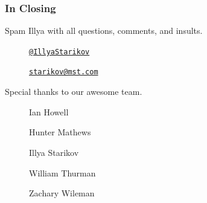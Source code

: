 \documentclass{beamer}
\begin{document}
\begin{frame}
    \frametitle{In Closing}

    Spam Illya with all questions, comments, and insults.
    \begin{description}
        \item[\faGithub]  \href{https://github.com/IllyaStarikov}{\nolinkurl{@IllyaStarikov}}
        \item[\faComment] \href{mailto:starikov@mst.edu}{\nolinkurl{starikov@mst.com}}
    \end{description}

    Special thanks to our awesome team.
    \begin{description}
        \item[\faUser] Ian Howell
        \item[\faUser] Hunter Mathews
        \item[\faUser] Illya Starikov
        \item[\faUser] William Thurman
        \item[\faUser] Zachary Wileman
    \end{description}
\end{frame}
\end{document}
